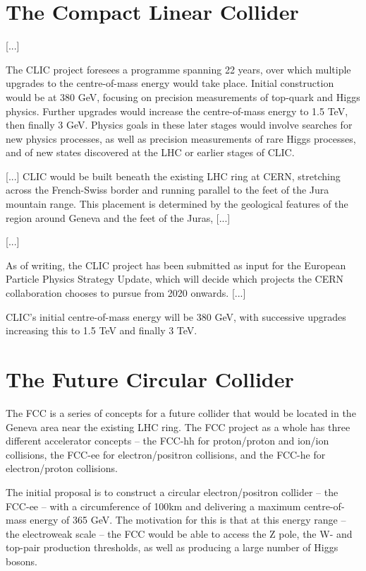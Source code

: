 \section{The Compact Linear Collider}
[...]

The CLIC project foresees a programme spanning 22 years, over which multiple upgrades to the centre-of-mass energy would take place. Initial construction would be at 380 GeV, focusing on precision measurements of top-quark and Higgs physics. Further upgrades would increase the centre-of-mass energy to 1.5 TeV, then finally 3 GeV. Physics goals in these later stages would involve searches for new physics processes, as well as precision measurements of rare Higgs processes, and of new states discovered at the LHC or earlier stages of CLIC. 

[...] CLIC would be built beneath the existing LHC ring at CERN, stretching across the French-Swiss border and running parallel to the feet of the Jura mountain range. This placement is determined by the geological features of the region around Geneva and the feet of the Juras, [...]


[...]

As of writing, the CLIC project has been submitted as input for the European Particle Physics Strategy Update, which will decide which projects the CERN collaboration chooses to pursue from 2020  onwards. [...]

CLIC's initial centre-of-mass energy will be 380 GeV, with successive upgrades increasing this to 1.5 TeV and finally 3 TeV. 

\section{The Future Circular Collider}
The \acrfull{FCC} is a series of concepts for a future collider that would be located in the Geneva area near the existing LHC ring. The FCC project as a whole has three different accelerator concepts -- the FCC-hh for proton/proton and ion/ion collisions, the FCC-ee for electron/positron collisions, and the FCC-he for electron/proton collisions.

The initial proposal is to construct a circular electron/positron collider -- the FCC-ee -- with a circumference of 100km and delivering a maximum centre-of-mass energy of 365 GeV. The motivation for this is that at this energy range -- the electroweak scale -- the FCC would be able to access the Z pole, the W- and top-pair production thresholds, as well as producing a large number of Higgs bosons. 

